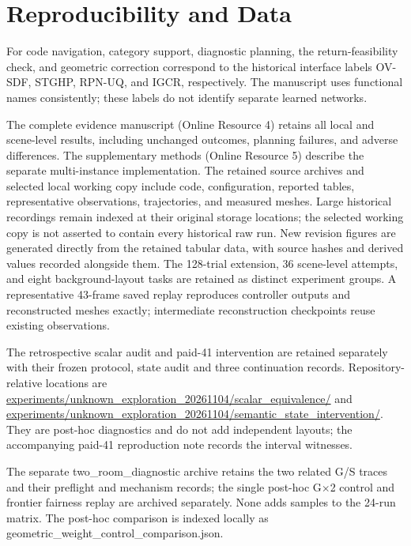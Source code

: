 \documentclass[11pt,a4paper]{article}
\providecommand{\hypertarget}[2]{#2}
\begin{document}
\hypertarget{reproducibility-and-data}{%
\section{Reproducibility and Data}\label{reproducibility-and-data}}

For code navigation, category support, diagnostic planning, the return-feasibility check, and geometric correction correspond to the historical interface labels OV-SDF, STGHP, RPN-UQ, and IGCR, respectively. The manuscript uses functional names consistently; these labels do not identify separate learned networks.

The complete evidence manuscript (Online Resource 4) retains all local and scene-level results, including unchanged outcomes, planning failures, and adverse differences. The supplementary methods (Online Resource 5) describe the separate multi-instance implementation. The retained source archives and selected local working copy include code, configuration, reported tables, representative observations, trajectories, and measured meshes. Large historical recordings remain indexed at their original storage locations; the selected working copy is not asserted to contain every historical raw run. New revision figures are generated directly from the retained tabular data, with source hashes and derived values recorded alongside them. The 128-trial extension, 36 scene-level attempts, and eight background-layout tasks are retained as distinct experiment groups. A representative 43-frame saved replay reproduces controller outputs and reconstructed meshes exactly; intermediate reconstruction checkpoints reuse existing observations.

The retrospective scalar audit and paid-41 intervention are retained separately with their frozen protocol, state audit and three continuation records. Repository-relative locations are \url{experiments/unknown_exploration_20261104/scalar_equivalence/} and \url{experiments/unknown_exploration_20261104/semantic_state_intervention/}. They are post-hoc diagnostics and do not add independent layouts; the accompanying paid-41 reproduction note records the interval witnesses.

The separate two\_room\_diagnostic archive retains the two related G/S traces and their preflight and mechanism records; the single post-hoc G$\times$2 control and frontier fairness replay are archived separately. None adds samples to the 24-run matrix. The post-hoc comparison is indexed locally as geometric\_weight\_control\_comparison.json.
\end{document}
